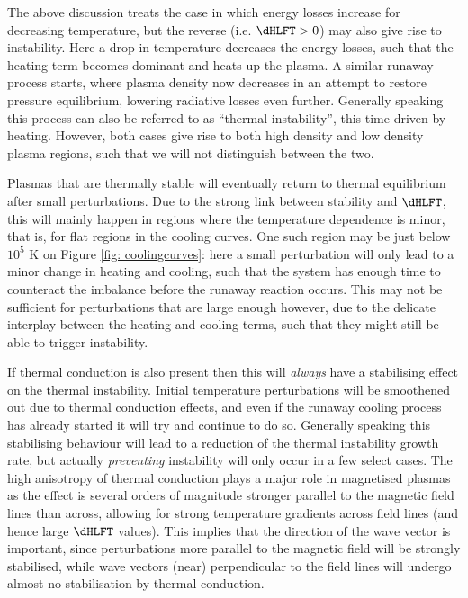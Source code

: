 The above discussion treats the case in which energy losses increase for decreasing temperature, but the reverse (i.e. $\dHLFT > 0$) may also give rise to instability. Here a drop in temperature decreases the energy losses, such that the heating term becomes dominant and heats up the plasma. A similar runaway process starts, where plasma density now decreases in an attempt to restore pressure equilibrium, lowering radiative losses even further. Generally speaking this process can also be referred to as ``thermal instability'', this time driven by heating. However, both cases give rise to both high density and low density plasma regions, such that we will not distinguish between the two.

Plasmas that are thermally stable will eventually return to thermal equilibrium after small perturbations. Due to the strong link between stability and $\dHLFT$, this will mainly happen in regions where the temperature dependence is minor, that is, for flat regions in the cooling curves. One such region may be just below $10^5$ K on Figure \ref{fig: coolingcurves}: here a small perturbation will only lead to a minor change in heating and cooling, such that the system has enough time to counteract the imbalance before the runaway reaction occurs. This may not be sufficient for perturbations that are large enough however, due to the delicate interplay between the heating and cooling terms, such that they might still be able to trigger instability.

If thermal conduction is also present then this will \emph{always} have a stabilising effect on the thermal instability. Initial temperature perturbations will be smoothened out due to thermal conduction effects, and even if the runaway cooling process has already started it will try and continue to do so. Generally speaking this stabilising behaviour will lead to a reduction of the thermal instability growth rate, but actually \emph{preventing} instability will only occur in a few select cases. The high anisotropy of thermal conduction plays a major role in magnetised plasmas as the effect is several orders of magnitude stronger parallel to the magnetic field lines than across, allowing for strong temperature gradients across field lines (and hence large $\dHLFT$ values). This implies that the direction of the wave vector is important, since perturbations more parallel to the magnetic field will be strongly stabilised, while wave vectors (near) perpendicular to the field lines will undergo almost no stabilisation by thermal conduction.

